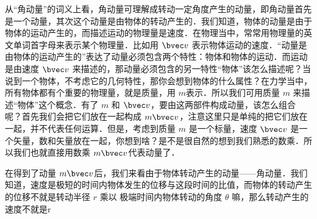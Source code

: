 
从“角动量”的词义上看，角动量可理解成转动一定角度产生的动量，即角动量首先是一个动量，其次这个动量是由物体的转动产生的．我们知道，物体的动量是由于物体的运动产生的，而描述运动的物理量是速度．在物理当中，常常用物理量的英文单词首字母来表示某个物理量．比如用 $\bvec v$ 表示物体运动的速度．“动量是由物体的运动产生的”表达了动量必须包含两个特性：物体和物体的运动．而运动是由速度 $\bvec v$ 来描述的，那动量必须包含的另一特性“物体”该怎么描述呢？当说到一个物体，不考虑它的几何特性，那你会想到物体的什么属性？在力学当中，所有物体都有个重要的物理量，就是质量，用 $m$表示．所以我们可用质量 $m$ 来描述“物体”这个概念．有了 $m$ 和 $\bvec v$，要由这两部件构成动量，该怎么组合呢？首先我们会把它们放在一起构成 $m\bvec v$，注意这里只是单纯的把它们放在一起，并不代表任何运算．但是，考虑到质量 $m$ 是一个标量，速度 $\bvec v$ 是一个矢量，数和矢量放在一起，你想到啥？是不是很自然的想到我们熟悉的数乘．所以我们也就直接用数乘 $m\bvec v$代表动量了．

在得到了动量 $m\bvec v$后，我们来看由于物体转动产生的动量——角动量．我们知道，速度是极短的时间内物体发生的位移与这段时间的比值，而物体的转动产生的位移不就是转动半径 $r$ 乘以 极端时间内物体转动的角度 $\theta$ 嘛，那么转动产生的速度不就是r